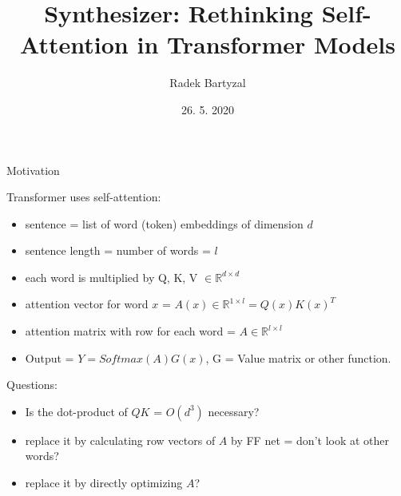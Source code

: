 \documentclass{beamer}
\begin{document}
\title[Synthesizer]{Synthesizer: Rethinking Self-Attention in Transformer Models}  
\author{Radek Bartyzal}
\date{26. 5. 2020} 

\frame{\titlepage} 

\begin{frame}{Motivation}

Transformer uses self-attention:
\begin{itemize}
\item sentence = list of word (token) embeddings of dimension $d$
\item sentence length = number of words = $l$
\item each word is multiplied by Q, K, V $\in \mathbb{R}^{d \times d}$
\item attention vector for word $x$ = $A(x) \in \mathbb{R}^{1 \times l} = Q(x)K(x)^T$
\item attention matrix with row for each word = $A \in \mathbb{R}^{l \times l}$
\item Output = $Y = Softmax(A)G(x)$, G = Value matrix or other function.
\end{itemize}

\vfill
Questions:
\begin{itemize}
\item Is the dot-product of $QK$ = $O(d^3)$ necessary? 
\item replace it by calculating row vectors of $A$ by FF net = don't look at other words?
\item replace it by directly optimizing $A$?
\end{itemize}

\end{frame}
\end{document}
